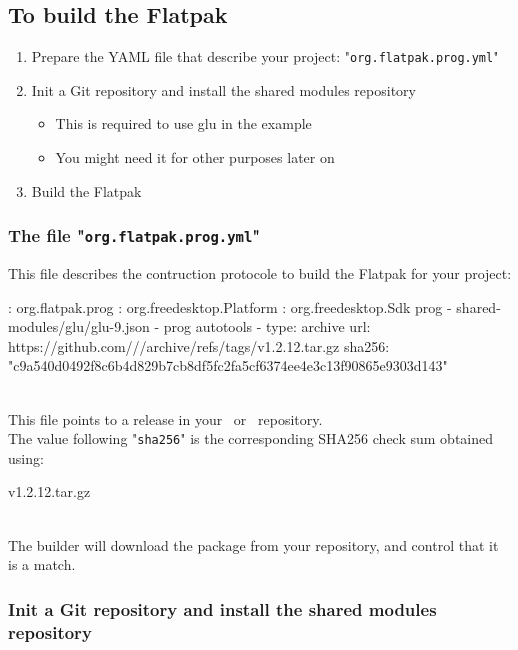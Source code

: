 \subsection{To build the Flatpak}

\begin{enumerate}
\item Prepare the YAML file that describe your project: "\texttt{org.flatpak.prog.yml}"
\item Init a Git repository and install the shared modules repository
\begin{itemize}
\item This is required to use glu in the example
\item You might need it for other purposes later on
\end{itemize}
\item Build the Flatpak
\end{enumerate}

\subsubsection{The file "\texttt{org.flatpak.prog.yml}"}

This file describes the contruction protocole to build the Flatpak for your project:
{\footnotesize{
\begin{script}
: org.flatpak.prog
: org.freedesktop.Platform
: 
 org.freedesktop.Sdk
 prog
  - shared-modules/glu/glu-9.json
  -  prog
     autotools
     
      - type: archive
	url: https://github.com///archive/refs/tags/v1.2.12.tar.gz
        sha256: "c9a540d0492f8c6b4d829b7cb8df5fc2fa5cf6374ee4e3c13f90865e9303d143"
\end{script}
}}
\\[-0.5cm]
\noindent This file points to a release in your \github\ or \gitlab\ repository. \\
The value following "\texttt{sha256}" is the corresponding SHA256 check sum obtained using: 
\begin{script}
 v1.2.12.tar.gz
\end{script} \\[-0.5cm]
\noindent
The builder will download the package from your repository, and control that it is a match. 

\subsubsection{Init a Git repository and install the shared modules repository}

